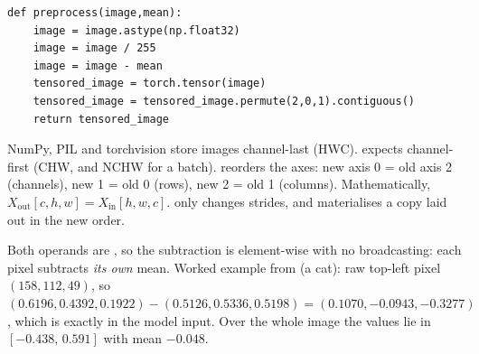 \begin{lstlisting}[firstnumber=29]
def preprocess(image,mean):
    image = image.astype(np.float32)
    image = image / 255
    image = image - mean
    tensored_image = torch.tensor(image)
    tensored_image = tensored_image.permute(2,0,1).contiguous()
    return tensored_image
\end{lstlisting}

\begin{center}
\end{center}

\begin{idea}
NumPy, PIL and torchvision store images channel-last (HWC).  expects channel-first (CHW, and NCHW for a batch).  reorders the axes: new axis 0 = old axis 2 (channels), new 1 = old 0 (rows), new 2 = old 1 (columns). Mathematically, $X_\text{out}[c,h,w] = X_\text{in}[h,w,c]$.  only changes strides, and  materialises a copy laid out in the new order.
\end{idea}

\begin{repo}
Both operands are , so the subtraction is element-wise with no broadcasting: each pixel subtracts \emph{its own} mean. Worked example from  (a cat): raw top-left pixel $(158,112,49)$, so $(0.6196,0.4392,0.1922)-(0.5126,0.5336,0.5198)=(0.1070,-0.0943,-0.3277)$, which is exactly  in the model input. Over the whole image the values lie in $[-0.438,\,0.591]$ with mean $-0.048$.
\end{repo}

